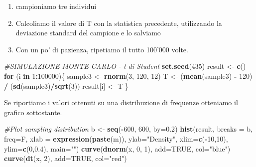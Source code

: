 \documentclass[a4paper,12pt,oneside]{book}
\providecommand{\tightlist}{%
  \setlength{\itemsep}{0pt}\setlength{\parskip}{0pt}}
\newenvironment{Shaded}{\begin{snugshade}}{\end{snugshade}}
\newcommand{\KeywordTok}[1]{\textcolor[rgb]{0.13,0.29,0.53}{\textbf{#1}}}
\newcommand{\DataTypeTok}[1]{\textcolor[rgb]{0.13,0.29,0.53}{#1}}
\newcommand{\DecValTok}[1]{\textcolor[rgb]{0.00,0.00,0.81}{#1}}
\newcommand{\FloatTok}[1]{\textcolor[rgb]{0.00,0.00,0.81}{#1}}
\newcommand{\StringTok}[1]{\textcolor[rgb]{0.31,0.60,0.02}{#1}}
\newcommand{\CommentTok}[1]{\textcolor[rgb]{0.56,0.35,0.01}{\textit{#1}}}
\newcommand{\OtherTok}[1]{\textcolor[rgb]{0.56,0.35,0.01}{#1}}
\newcommand{\ControlFlowTok}[1]{\textcolor[rgb]{0.13,0.29,0.53}{\textbf{#1}}}
\newcommand{\OperatorTok}[1]{\textcolor[rgb]{0.81,0.36,0.00}{\textbf{#1}}}
\newcommand{\NormalTok}[1]{#1}
\theoremstyle{definition}
\theoremstyle{definition}
\theoremstyle{definition}
\theoremstyle{remark}
\begin{document}
\begin{enumerate}
\def\labelenumi{\arabic{enumi}.}
\tightlist
\item
  campioniamo tre individui
\item
  Calcoliamo il valore di T con la statistica precedente, utilizzando la
  deviazione standard del campione e lo salviamo
\item
  Con un po' di pazienza, ripetiamo il tutto 100'000 volte.
\end{enumerate}

\begin{Shaded}
\begin{Highlighting}[]
\CommentTok{#SIMULAZIONE MONTE CARLO - t di Student}
\KeywordTok{set.seed}\NormalTok{(}\DecValTok{435}\NormalTok{)}
\NormalTok{result <-}\StringTok{ }\KeywordTok{c}\NormalTok{()}
\ControlFlowTok{for}\NormalTok{ (i }\ControlFlowTok{in} \DecValTok{1}\OperatorTok{:}\DecValTok{100000}\NormalTok{)\{}
\NormalTok{  sample3 <-}\StringTok{ }\KeywordTok{rnorm}\NormalTok{(}\DecValTok{3}\NormalTok{, }\DecValTok{120}\NormalTok{, }\DecValTok{12}\NormalTok{)}
\NormalTok{  T <-}\StringTok{ }\NormalTok{(}\KeywordTok{mean}\NormalTok{(sample3) }\OperatorTok{-}\StringTok{ }\DecValTok{120}\NormalTok{) }\OperatorTok{/}\StringTok{ }\NormalTok{(}\KeywordTok{sd}\NormalTok{(sample3)}\OperatorTok{/}\KeywordTok{sqrt}\NormalTok{(}\DecValTok{3}\NormalTok{))}
\NormalTok{  result[i] <-}\StringTok{ }\NormalTok{T}
\NormalTok{  \}}
\end{Highlighting}
\end{Shaded}

Se riportiamo i valori ottenuti su una distribuzione di frequenze
otteniamo il grafico sottostante.

\begin{Shaded}
\begin{Highlighting}[]
\CommentTok{#Plot sampling distribution}
\NormalTok{b <-}\StringTok{ }\KeywordTok{seq}\NormalTok{(}\OperatorTok{-}\DecValTok{600}\NormalTok{, }\DecValTok{600}\NormalTok{, }\DataTypeTok{by=}\FloatTok{0.2}\NormalTok{)}
\KeywordTok{hist}\NormalTok{(result, }\DataTypeTok{breaks =}\NormalTok{ b, }\DataTypeTok{freq=}\NormalTok{F, }\DataTypeTok{xlab =} \KeywordTok{expression}\NormalTok{(}\KeywordTok{paste}\NormalTok{(m)), }\DataTypeTok{ylab=}\StringTok{"Density"}\NormalTok{, }\DataTypeTok{xlim=}\KeywordTok{c}\NormalTok{(}\OperatorTok{-}\DecValTok{10}\NormalTok{,}\DecValTok{10}\NormalTok{), }\DataTypeTok{ylim=}\KeywordTok{c}\NormalTok{(}\DecValTok{0}\NormalTok{,}\FloatTok{0.4}\NormalTok{), }\DataTypeTok{main=}\StringTok{""}\NormalTok{)}
\KeywordTok{curve}\NormalTok{(}\KeywordTok{dnorm}\NormalTok{(x, }\DecValTok{0}\NormalTok{, }\DecValTok{1}\NormalTok{), }\DataTypeTok{add=}\OtherTok{TRUE}\NormalTok{, }\DataTypeTok{col=}\StringTok{"blue"}\NormalTok{)}
\KeywordTok{curve}\NormalTok{(}\KeywordTok{dt}\NormalTok{(x, }\DecValTok{2}\NormalTok{), }\DataTypeTok{add=}\OtherTok{TRUE}\NormalTok{, }\DataTypeTok{col=}\StringTok{"red"}\NormalTok{)}
\end{Highlighting}
\end{Shaded}
\end{document}
